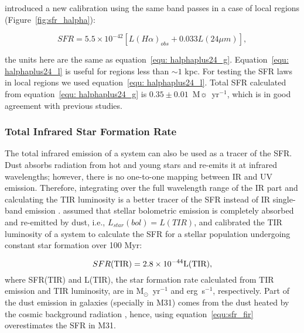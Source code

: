 \documentclass[useAMS,usenatbib]{mn2e}
\begin{document}
\cite{Calzetti07} introduced a new calibration using the same band passes in a case of local regions (Figure~\ref{fig:sfr_halpha}):

\begin{equation}
\label{equ: halphaplus24_l}
SFR = 5.5 \times 10^{-42}[L(H{\alpha})_{obs} + 0.033L(24\mu m)],
\end{equation}

\noindent the units here are the same as equation~\ref{equ: halphaplus24_g}. Equation~\ref{equ: halphaplus24_l} is useful for regions less than $\sim 1$ kpc. For testing the SFR laws in local regions we used equation~\ref{equ: halphaplus24_l}. Total SFR calculated from equation~\ref{equ: halphaplus24_g} is $0.35 \pm 0.01$~M$\sun$~yr$^{-1}$, which is in good agreement with previous studies.

\subsubsection{Total Infrared Star Formation Rate}
\label{sec:sfr_fir}
The total infrared emission of a system can also be used as a tracer of the SFR. Dust absorbs radiation from hot and young stars and re-emits it at infrared wavelengths; however, there is no one-to-one mapping between IR and UV emission. Therefore, integrating over the full wavelength range of the IR part and calculating the TIR luminosity is a better tracer of the SFR instead of IR single-band emission \citep{Calzetti13}. \cite{Calzetti13} assumed that stellar bolometric emission is completely absorbed and re-emitted by dust, i.e., $L_{star}(bol) = L(TIR)$, and calibrated the TIR luminosity of a system to calculate the SFR for a stellar population undergoing constant star formation over 100 Myr:

\begin{equation}
\label{equ:sfr_fir}
SFR(\rm TIR) = 2.8 \times10^{-44}L(\rm TIR),
\end{equation}
\noindent where SFR(TIR) and L(TIR), the star formation rate calculated from TIR emission and TIR luminosity, are in M$_{\odot}$~yr$^{-1}$ and erg~s$^{-1}$, respectively. Part of the dust emission in galaxies (specially in M31) comes from the dust heated by the cosmic background radiation \citep[e.g.][]{Dole06, Calzetti13, Mattsson14}, hence, using equation~\ref{equ:sfr_fir} overestimates the SFR in M31.  
\end{document}
